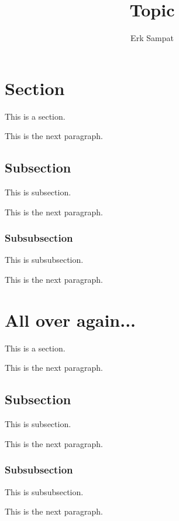 

\title{Topic}
\author{Erk Sampat}

\maketitle
\section{Section}
This is a section.

This is the next paragraph.
\subsection{Subsection}
This is subsection.

This is the next paragraph.
\subsubsection{Subsubsection}
This is subsubsection.

This is the next paragraph.
\section{All over again...}
This is a section.

This is the next paragraph.
\subsection{Subsection}
This is subsection.

This is the next paragraph.
\subsubsection{Subsubsection}
This is subsubsection.

This is the next paragraph.
